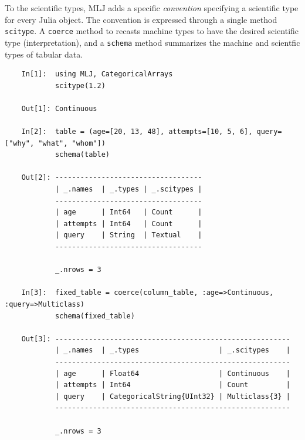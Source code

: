 \documentclass{article}
\begin{document}
To the scientific types, MLJ adds a specific \textit{convention} specifying a scientific type for every Julia object. The convention is expressed through a single method \texttt{scitype}. A \texttt{coerce} method to recasts machine types to have the desired scientific type (interpretation), and a \texttt{schema} method summarizes the machine and scientfic types of tabular data.

\begin{verbatim}
    In[1]:  using MLJ, CategoricalArrays
            scitype(1.2)
    
    Out[1]: Continuous
    
    In[2]:  table = (age=[20, 13, 48], attempts=[10, 5, 6], query=["why", "what", "whom"])
            schema(table)
    
    Out[2]: -----------------------------------
            | _.names  | _.types | _.scitypes |
            -----------------------------------
            | age      | Int64   | Count      |
            | attempts | Int64   | Count      |
            | query    | String  | Textual    |
            -----------------------------------
    
            _.nrows = 3

    In[3]:  fixed_table = coerce(column_table, :age=>Continuous, :query=>Multiclass)
            schema(fixed_table)
    
    Out[3]: --------------------------------------------------------
            | _.names  | _.types                   | _.scitypes    |
            --------------------------------------------------------
            | age      | Float64                   | Continuous    |
            | attempts | Int64                     | Count         |
            | query    | CategoricalString{UInt32} | Multiclass{3} |
            --------------------------------------------------------
            
            _.nrows = 3
\end{verbatim}


\end{document}
